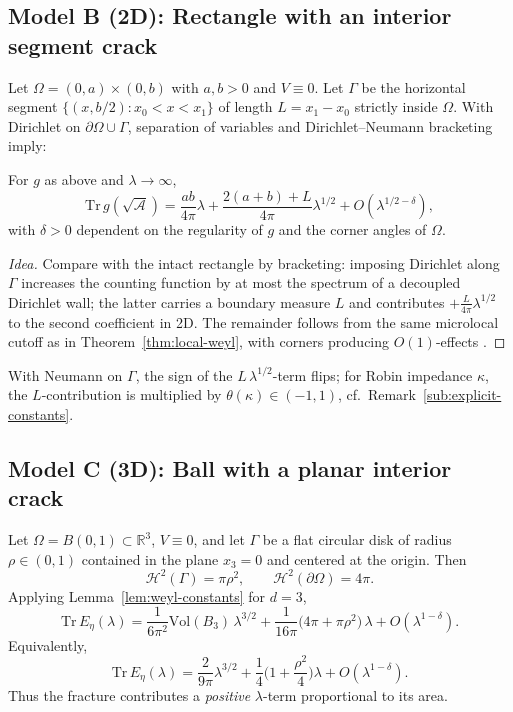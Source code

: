 \subsection{Model B (2D): Rectangle with an interior segment crack}
\label{sub:model-rectangle-crack}

Let $\Omega=(0,a)\times(0,b)$ with $a,b>0$ and $V\equiv 0$.
Let $\Gamma$ be the horizontal segment $\{(x,b/2): x_0< x< x_1\}$ of length $L=x_1-x_0$
strictly inside $\Omega$. With Dirichlet on $\partial\Omega\cup\Gamma$,
separation of variables and Dirichlet--Neumann bracketing imply:

\begin{proposition}
\label{prop:rect-fracture}
For $g$ as above and $\lambda\to\infty$,
\[
\mathrm{Tr}\,g(\sqrt{\mathcal{A}})
=\frac{ab}{4\pi}\lambda
+\frac{2(a+b)+L}{4\pi}\lambda^{1/2}+O(\lambda^{1/2-\delta}),
\]
with $\delta>0$ dependent on the regularity of $g$ and the corner angles of $\Omega$.
\end{proposition}

\begin{proof}[Idea]
Compare with the intact rectangle by bracketing: imposing Dirichlet along $\Gamma$
increases the counting function by at most the spectrum of a decoupled Dirichlet wall;
the latter carries a boundary measure $L$ and contributes $+\frac{L}{4\pi}\lambda^{1/2}$
to the second coefficient in 2D. The remainder follows from the same microlocal cutoff
as in Theorem~\ref{thm:local-weyl}, with corners producing $O(1)$-effects \cite{SafarovVassiliev1997}.
\end{proof}

\begin{remark}
With Neumann on $\Gamma$, the sign of the $L\,\lambda^{1/2}$-term flips;
for Robin impedance $\kappa$, the $L$-contribution is multiplied by $\theta(\kappa)\in(-1,1)$,
cf.\ Remark~\ref{sub:explicit-constants}.
\end{remark}

\subsection{Model C (3D): Ball with a planar interior crack}
\label{sub:model-ball-crack-3d}

Let $\Omega=B(0,1)\subset\mathbb{R}^3$, $V\equiv 0$,
and let $\Gamma$ be a flat circular disk of radius $\rho\in(0,1)$ contained in the plane $x_3=0$
and centered at the origin. Then
\[
\mathcal{H}^{2}(\Gamma)=\pi\rho^2,\qquad \mathcal{H}^{2}(\partial\Omega)=4\pi.
\]
Applying Lemma~\ref{lem:weyl-constants} for $d=3$,
\[
\mathrm{Tr}\,E_\eta(\lambda)
= \frac{1}{6\pi^2}\mathrm{Vol}(B_3)\,\lambda^{3/2}
+ \frac{1}{16\pi}\big(4\pi + \pi\rho^2\big)\,\lambda
+ O(\lambda^{1-\delta}).
\]
Equivalently,
\[
\mathrm{Tr}\,E_\eta(\lambda)=\frac{2}{9\pi}\lambda^{3/2}
+ \frac{1}{4}\Big(1+\frac{\rho^2}{4}\Big)\lambda + O(\lambda^{1-\delta}).
\]
Thus the fracture contributes a \emph{positive} $\lambda$-term proportional to its area.

